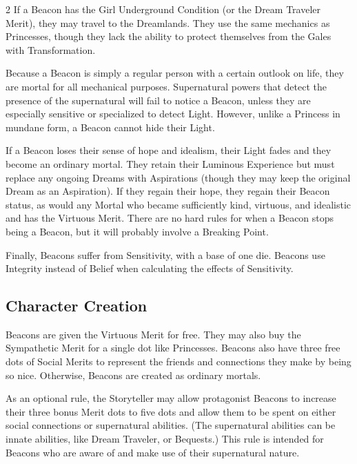 \begin{multicols}{2}
If a Beacon has the Girl Underground Condition (or the Dream Traveler Merit), they may travel to the Dreamlands. They use the same mechanics as Princesses, though they lack the ability to protect themselves from the Gales with Transformation.

Because a Beacon is simply a regular person with a certain outlook on life, they are mortal for all mechanical purposes. Supernatural powers that detect the presence of the supernatural will fail to notice a Beacon, unless they are especially sensitive or specialized to detect Light. However, unlike a Princess in mundane form, a Beacon cannot hide their Light.

If a Beacon loses their sense of hope and idealism, their Light fades and they become an ordinary mortal. They retain their Luminous Experience but must replace any ongoing Dreams with Aspirations (though they may keep the original Dream as an Aspiration). If they regain their hope, they regain their Beacon status, as would any Mortal who became sufficiently kind, virtuous, and idealistic and has the Virtuous Merit. There are no hard rules for when a Beacon stops being a Beacon, but it will probably involve a Breaking Point. 

Finally, Beacons suffer from Sensitivity, with a base of one die. Beacons use Integrity instead of Belief when calculating the effects of Sensitivity. 

\subsection*{Character Creation}

Beacons are given the Virtuous Merit for free. They may also buy the Sympathetic Merit for a single dot like Princesses. Beacons also have three free dots of Social Merits to represent the friends and connections they make by being so nice. Otherwise, Beacons are created as ordinary mortals.

As an optional rule, the Storyteller may allow protagonist Beacons to increase their three bonus Merit dots to five dots and allow them to be spent on either social connections or supernatural abilities. (The supernatural abilities can be innate abilities, like Dream Traveler, or Bequests.) This rule is intended for Beacons who are aware of and make use of their supernatural nature.


\end{multicols}
